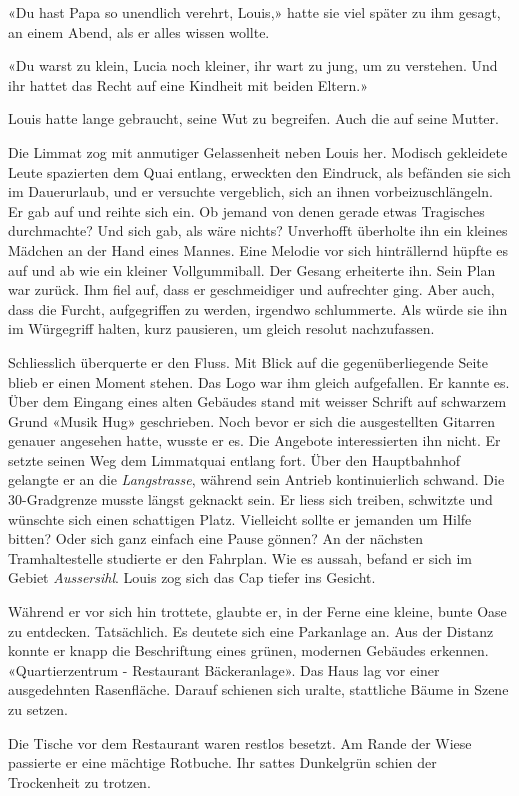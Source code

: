 «Du hast Papa so unendlich verehrt, Louis,» hatte sie viel später zu ihm
gesagt, an einem Abend, als er alles wissen wollte.

«Du warst zu klein, Lucia noch kleiner, ihr wart zu jung, um zu
verstehen. Und ihr hattet das Recht auf eine Kindheit mit beiden
Eltern.»

Louis hatte lange gebraucht, seine Wut zu begreifen. Auch die auf seine Mutter.

\sectionbreak

Die Limmat zog mit anmutiger Gelassenheit neben Louis her. Modisch gekleidete Leute spazierten dem Quai entlang, erweckten den Eindruck, als befänden sie sich im Dauerurlaub,  und er versuchte vergeblich, sich an ihnen vorbeizuschlängeln. Er gab auf und reihte sich ein. Ob jemand von denen gerade etwas Tragisches durchmachte? Und sich gab, als wäre nichts? Unverhofft überholte ihn ein kleines Mädchen an der Hand eines Mannes. Eine Melodie vor sich hinträllernd hüpfte es auf und ab wie ein kleiner Vollgummiball. Der Gesang erheiterte ihn. Sein Plan war zurück. Ihm fiel auf, dass er geschmeidiger und aufrechter ging. Aber auch, dass die Furcht, aufgegriffen zu werden, irgendwo schlummerte. Als würde sie ihn im Würgegriff halten, kurz pausieren, um gleich resolut nachzufassen. 

Schliesslich überquerte er den Fluss. Mit Blick auf die gegenüberliegende Seite blieb er einen Moment stehen. Das Logo war ihm gleich aufgefallen. Er kannte es. Über dem Eingang eines alten Gebäudes stand mit weisser Schrift auf schwarzem Grund «Musik Hug» geschrieben. Noch bevor er sich die ausgestellten Gitarren genauer angesehen hatte, wusste er es. Die Angebote interessierten ihn nicht. Er setzte seinen Weg dem Limmatquai entlang fort. Über den Hauptbahnhof gelangte er an die \emph{Langstrasse}, während sein Antrieb kontinuierlich schwand. Die 30-Gradgrenze musste längst geknackt sein. Er liess sich treiben, schwitzte und wünschte sich einen schattigen Platz. Vielleicht sollte er jemanden um Hilfe bitten? Oder sich ganz einfach eine Pause gönnen? An der nächsten Tramhaltestelle studierte er den Fahrplan. Wie es aussah, befand er sich im Gebiet \emph{Aussersihl}. Louis zog sich das Cap tiefer ins Gesicht. 

Während er vor sich hin trottete, glaubte er, in der Ferne eine kleine, bunte Oase zu entdecken. Tatsächlich. Es deutete sich eine Parkanlage an. Aus der Distanz konnte er knapp die Beschriftung eines grünen, modernen Gebäudes erkennen. «Quartierzentrum - Restaurant Bäckeranlage».
Das Haus lag vor einer ausgedehnten Rasenfläche. Darauf schienen sich
uralte, stattliche Bäume in Szene zu setzen. 

Die Tische vor dem Restaurant waren restlos besetzt. 
Am Rande der Wiese passierte er eine mächtige Rotbuche. Ihr sattes Dunkelgrün schien der Trockenheit zu
trotzen. 